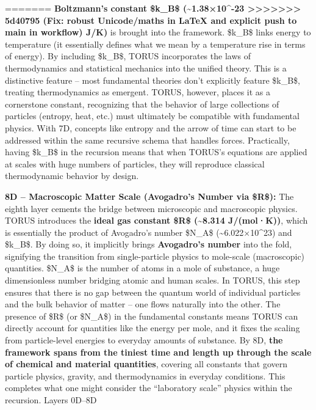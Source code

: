 \documentclass[]{article}
\begin{document}
\begin{itemize}
{=======
  \textbf{Boltzmann's constant \$k\_B\$ (\textasciitilde{}1.38×10\^{}-23
>>>>>>> 5d40795 (Fix: robust Unicode/maths in LaTeX and explicit push to main in workflow)
  J/K)} is brought into the framework. \$k\_B\$ links energy to
  temperature (it essentially defines what we mean by a temperature rise
  in terms of energy). By including \$k\_B\$, TORUS incorporates the
  laws of thermodynamics and statistical mechanics into the unified
  theory. This is a distinctive feature -- most fundamental theories
  don't explicitly feature \$k\_B\$, treating thermodynamics as
  emergent. TORUS, however, places it as a cornerstone constant,
  recognizing that the behavior of large collections of particles
  (entropy, heat, etc.) must ultimately be compatible with fundamental
  physics. With 7D, concepts like entropy and the arrow of time can
  start to be addressed within the same recursive schema that handles
  forces. Practically, having \$k\_B\$ in the recursion means that when
  TORUS's equations are applied at scales with huge numbers of
  particles, they will reproduce classical thermodynamic behavior by
  design.
\item
  \textbf{8D -- Macroscopic Matter Scale (Avogadro's Number via \$R\$):}
  The eighth layer cements the bridge between microscopic and
  macroscopic physics. TORUS introduces the \textbf{ideal gas constant
  \$R\$ (\textasciitilde{}8.314 J/(mol·K))}, which is essentially the
  product of Avogadro's number \$N\_A\$
  (\textasciitilde{}6.022×10\^{}23) and \$k\_B\$​. By doing so, it
  implicitly brings \textbf{Avogadro's number} into the fold, signifying
  the transition from single-particle physics to mole-scale
  (macroscopic) quantities. \$N\_A\$ is the number of atoms in a mole of
  substance, a huge dimensionless number bridging atomic and human
  scales. In TORUS, this step ensures that there is no gap between the
  quantum world of individual particles and the bulk behavior of matter
  -- one flows naturally into the other. The presence of \$R\$ (or
  \$N\_A\$) in the fundamental constants means TORUS can directly
  account for quantities like the energy per mole, and it fixes the
  scaling from particle-level energies to everyday amounts of substance.
  By 8D, \textbf{the framework spans from the tiniest time and length up
  through the scale of chemical and material quantities}, covering all
  constants that govern particle physics, gravity, and thermodynamics in
  everyday conditions. This completes what one might consider the
  ``laboratory scale'' physics within the recursion. Layers 0D--8D
}
\end{itemize}
\end{document}
